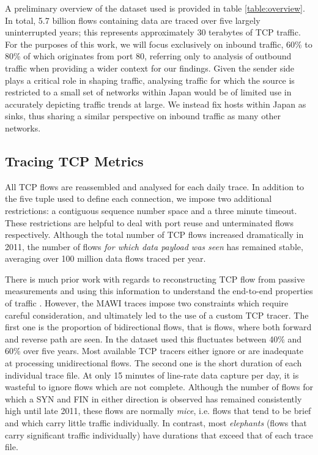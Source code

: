 A preliminary overview of the dataset used is provided in table \ref{table:overview}. 
In total, 5.7 billion flows containing data are traced over five largely uninterrupted years; this represents approximately 30 terabytes of TCP traffic. For the purposes of this work, we will focus exclusively on inbound traffic, 60\% to 80\% of which originates from port 80, referring only to analysis of outbound traffic when providing a wider context for our findings.
Given the sender side plays a critical role in shaping traffic, analysing traffic for which the source is restricted to a small set of networks within Japan would be of limited use in accurately depicting traffic trends at large.
We instead fix hosts within Japan as sinks, thus sharing a similar perspective on inbound traffic as many other networks. 

\subsection{Tracing TCP Metrics}

All TCP flows are reassembled and analysed for each daily trace.
In addition to the five tuple used to define each connection, we impose two additional restrictions: a contiguous sequence number space and a three minute timeout. These restrictions are helpful to deal with port reuse and unterminated flows respectively.  
Although the total number of TCP flows increased dramatically in 2011, the number of flows \emph{for which data payload was seen} has remained stable, averaging over 100 million data flows traced per year.  

There is much prior work with regards to reconstructing TCP flow from passive measurements and using this information to understand the end-to-end properties of traffic \cite{firstRTT,Jaiswal:2007p233,Rewaskar:2007p195,Shakkottai:2004p408}. However, the MAWI traces impose two constraints which require careful consideration, and ultimately led to the use of a custom TCP tracer. 
The first one is the proportion of bidirectional flows, that is flows, where both forward and reverse path are seen. 
In the dataset used this fluctuates between 40\% and 60\% over five years.
Most available TCP tracers either ignore or are inadequate at processing unidirectional flows. 
The second one is the short duration of each individual trace file. 
At only 15 minutes of line-rate data capture per day, it is wasteful to ignore flows which are not complete. Although the number of flows for which a SYN and FIN in either direction is observed has remained consistently high until late 2011, these flows are normally \emph{mice}, i.e. flows that tend to be brief and which carry little traffic individually. In contrast, most \emph{elephants} (flows that carry significant traffic individually) have durations that exceed that of each trace file. 

